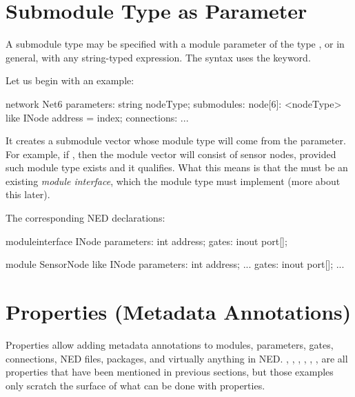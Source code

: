 \section{Submodule Type as Parameter}
\label{sec:ch-ned-lang:submodule-like}

A submodule type may be specified with a module parameter of the type
, or in general, with any string-typed expression.
The syntax uses the  keyword.

Let us begin with an example:

\begin{ned}
network Net6
{
    parameters:
        string nodeType;
    submodules:
        node[6]: <nodeType> like INode {
            address = index;
        }
    connections:
        ...
}
\end{ned}

It creates a submodule vector whose module type will come from the
 parameter. For example, if ,
then the module vector will consist of sensor nodes, provided such module
type exists and it qualifies. What this means is that the  must be
an existing \textit{module interface}, which the 
module type must implement (more about this later).

The corresponding NED declarations:

\begin{ned}
moduleinterface INode
{
    parameters:
        int address;
    gates:
        inout port[];
}
\end{ned}

\begin{ned}
module SensorNode like INode
{
    parameters:
        int address;
        ...
    gates:
        inout port[];
        ...
}
\end{ned}



\section{Properties (Metadata Annotations)}
\label{sec:ch-ned-lang:properties}

Properties allow adding metadata annotations to modules, parameters, gates,
connections, NED files, packages, and virtually anything in NED.
, , , , ,
,  are all properties that have been mentioned in
previous sections, but those examples only scratch the surface of what can
be done with properties.

